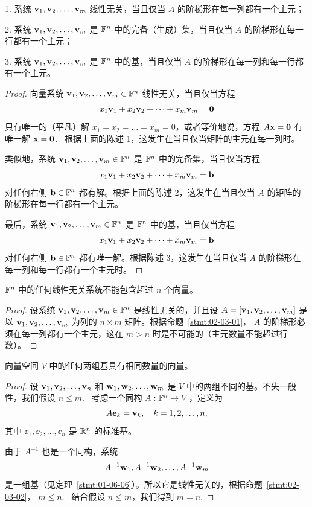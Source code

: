 1. 系统 $\mathbf{v}_1, \mathbf{v}_2, \dots, \mathbf{v}_m$ 线性无关，当且仅当 $A$ 的阶梯形在每一列都有一个主元；

2. 系统 $\mathbf{v}_1, \mathbf{v}_2, \dots, \mathbf{v}_m$ 是 $\mathbb{F}^n$ 中的完备（生成）集，当且仅当 $A$ 的阶梯形在每一行都有一个主元；

3. 系统 $\mathbf{v}_1, \mathbf{v}_2, \dots, \mathbf{v}_m$ 是 $\mathbb{F}^n$ 中的基，当且仅当 $A$ 的阶梯形在每一列和每一行都有一个主元。

\begin{proof} 向量系统 $\mathbf{v}_1, \mathbf{v}_2, \dots, \mathbf{v}_m \in \mathbb{F}^n$ 线性无关，当且仅当方程
$$x_1 \mathbf{v}_1 + x_2 \mathbf{v}_2 + \dots + x_m \mathbf{v}_m = \mathbf{0}$$
只有唯一的（平凡）解 $x_1 = x_2 = \dots = x_m = 0$，或者等价地说，方程 $A \mathbf{x} = \mathbf{0}$ 有唯一解 $\mathbf{x} = \mathbf{0}$. ~根据上面的陈述 1，这发生在当且仅当矩阵的主元在每一列时。

类似地，系统 $\mathbf{v}_1, \mathbf{v}_2, \dots, \mathbf{v}_m \in \mathbb{F}^n$ 是 $\mathbb{F}^n$ 中的完备集，当且仅当方程
$$x_1 \mathbf{v}_1 + x_2 \mathbf{v}_2 + \dots + x_m \mathbf{v}_m = \mathbf{b}$$
对任何右侧 $\mathbf{b} \in \mathbb{F}^n$ 都有解。根据上面的陈述 2，这发生在当且仅当 $A$ 的矩阵的阶梯形在每一行都有一个主元。

最后，系统 $\mathbf{v}_1, \mathbf{v}_2, \dots, \mathbf{v}_m \in \mathbb{F}^n$ 是 $\mathbb{F}^n$ 中的基，当且仅当方程
$$x_1 \mathbf{v}_1 + x_2 \mathbf{v}_2 + \dots + x_m \mathbf{v}_m = \mathbf{b}$$
对任何右侧 $\mathbf{b} \in \mathbb{F}^n$ 都有唯一解。根据陈述 3，这发生在当且仅当 $A$ 的阶梯形在每一列和每一行都有一个主元时。\end{proof}

\begin{proposition}\label{stmt:02-03-02}
$\mathbb{F}^n$ 中的任何线性无关系统不能包含超过 $n$ 个向量。
\end{proposition}

\begin{proof} 设系统 $\mathbf{v}_1, \mathbf{v}_2, \dots, \mathbf{v}_m \in \mathbb{F}^n$ 是线性无关的，并且设 $A = [\mathbf{v}_1, \mathbf{v}_2, \dots, \mathbf{v}_m]$ 是以 $\mathbf{v}_1, \mathbf{v}_2, \dots, \mathbf{v}_m$ 为列的 $n \times m$ 矩阵。根据命题~\ref{stmt:02-03-01}， $A$ 的阶梯形必须在每一列都有一个主元，这在 $m > n$ 时是不可能的（主元数量不能超过行数）。\end{proof}

\begin{proposition}\label{stmt:02-03-03}
向量空间 $V$ 中的任何两组基具有相同数量的向量。
\end{proposition}

\begin{proof} 设 $\mathbf{v}_1, \mathbf{v}_2, \dots, \mathbf{v}_n$ 和 $\mathbf{w}_1, \mathbf{w}_2, \dots, \mathbf{w}_m$ 是 $V$ 中的两组不同的基。不失一般性，我们假设 $n \le m$. ~考虑一个同构 $A: \mathbb{F}^n \to V$，定义为
$$A \mathbf{e}_k = \mathbf{v}_k, \quad k = 1, 2, \dots, n,$$
其中 $\ee_1, \ee_2, \dots, \ee_n$ 是 $\mathbb{R}^n$ 的标准基。

由于 $A^{-1}$ 也是一个同构，系统
$$A^{-1} \mathbf{w}_1, A^{-1} \mathbf{w}_2, \dots, A^{-1} \mathbf{w}_m$$
是一组基（见定理~\ref{stmt:01-06-06}）。所以它是线性无关的，根据命题~\ref{stmt:02-03-02}， $m \le n$. ~结合假设 $n \le m$，我们得到 $m=n$. \end{proof}

